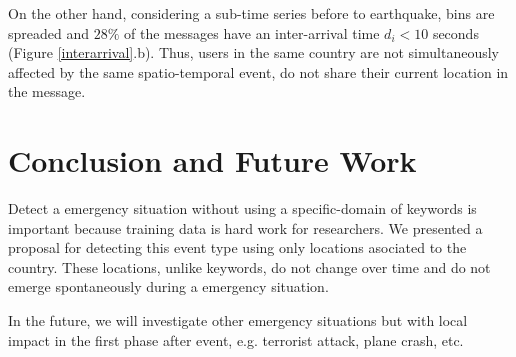 \documentclass[letterpaper]{article} %
\begin{document}
On the other hand, considering a sub-time series before to earthquake, bins are spreaded and $28\%$ of the messages have an inter-arrival time $d_{i} < 10$ seconds (Figure \ref{interarrival}.b). Thus, users in the same country are not simultaneously affected by the same spatio-temporal event, do not share their current location in the message.

\section{Conclusion and Future Work}
Detect a emergency situation without using a specific-domain of keywords is important because training data is hard work for researchers. We presented a proposal for detecting this event type using only locations asociated to the country. These locations, unlike keywords, do not change over time and do not emerge spontaneously during a emergency situation.

In the future, we will investigate other emergency situations but with local impact in the first phase after event, e.g. terrorist attack, plane crash, etc.
 


\end{document}
